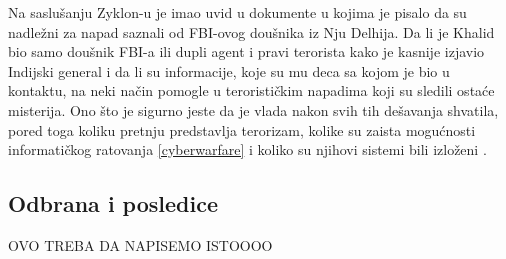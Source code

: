 \documentclass[a4paper]{article}
\begin{document}
Na saslušanju Zyklon-u je imao uvid u dokumente u kojima je pisalo da su nadležni za napad saznali od FBI-ovog doušnika iz Nju Delhija. Da li je Khalid bio samo doušnik FBI-a ili dupli agent i pravi terorista kako je kasnije izjavio Indijski general i da li su informacije, koje su mu deca sa kojom je bio u kontaktu, na neki način pomogle u terorističkim napadima koji su sledili ostaće misterija. Ono što je sigurno jeste da je vlada nakon svih tih dešavanja shvatila, pored toga koliku pretnju predstavlja terorizam, kolike su zaista mogućnosti informatičkog ratovanja \ref{cyberwarfare} i koliko su njihovi sistemi bili izloženi \cite{intrusion}.

\subsection{Odbrana i posledice }

OVO TREBA DA NAPISEMO ISTOOOO 
\end{document}
